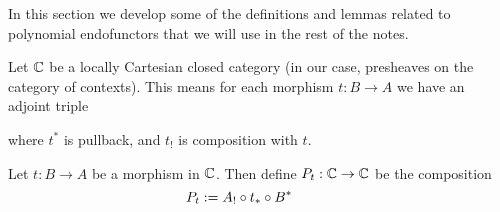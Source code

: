 In this section we develop some of the definitions
and lemmas related to polynomial endofunctors that we will use
in the rest of the notes.

\medskip

\begin{definition}
  \label{defn:UvPoly}
   \leanok
  Let $\mathbb{C}$ be a locally Cartesian closed category
  (in our case, presheaves on the category of contexts).
  This means for each morphism $t : B \to A$ we have an adjoint triple
  \begin{center}\end{center}
  where $t^{*}$ is pullback, and $t_{!}$ is composition with $t$.

  Let $t : B \to A$ be a morphism in $\mathbb{C}$.
  Then define $P_{t} : \mathbb{C} \to \mathbb{C}$ be the composition
  \[
    P_{t} := A_{!} \circ t_{*} \circ B^{*}
    \quad \quad \quad
  \]
  \begin{center}\end{center}
\end{definition}

